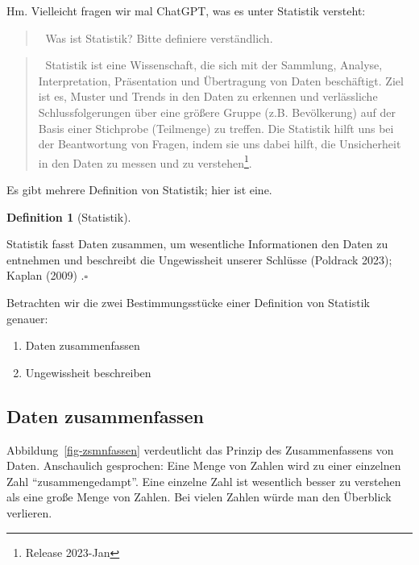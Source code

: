 \documentclass[
  a4paper,
  DIV=11]{scrreprt}
\providecommand{\tightlist}{%
  \setlength{\itemsep}{0pt}\setlength{\parskip}{0pt}}\usepackage{longtable,booktabs,array}
\theoremstyle{definition}
\theoremstyle{definition}
\theoremstyle{definition}
\newtheorem{definition}{Definition}[chapter]
\theoremstyle{remark}
\begin{document}
Hm. Vielleicht fragen wir mal ChatGPT, was es unter Statistik versteht:

\begin{quote}
👨 Was ist Statistik? Bitte definiere verständlich.
\end{quote}

\begin{quote}
🤖 Statistik ist eine Wissenschaft, die sich mit der Sammlung, Analyse,
Interpretation, Präsentation und Übertragung von Daten beschäftigt. Ziel
ist es, Muster und Trends in den Daten zu erkennen und verlässliche
Schlussfolgerungen über eine größere Gruppe (z.B. Bevölkerung) auf der
Basis einer Stichprobe (Teilmenge) zu treffen. Die Statistik hilft uns
bei der Beantwortung von Fragen, indem sie uns dabei hilft, die
Unsicherheit in den Daten zu messen und zu verstehen\footnote{Release
  2023-Jan}.
\end{quote}

Es gibt mehrere Definition von Statistik; hier ist eine.

\begin{definition}[Statistik]\protect\hypertarget{def-statistik}{}\label{def-statistik}

Statistik fasst Daten zusammen, um wesentliche Informationen den Daten
zu entnehmen und beschreibt die Ungewissheit unserer Schlüsse (Poldrack
2023); Kaplan (2009) .\(\square\)

\end{definition}

Betrachten wir die zwei Bestimmungsstücke einer Definition von Statistik
genauer:

\begin{enumerate}
\def\labelenumi{\arabic{enumi}.}
\tightlist
\item
  Daten zusammenfassen
\item
  Ungewissheit beschreiben
\end{enumerate}

\subsection{Daten zusammenfassen}\label{daten-zusammenfassen}

Abbildung~\ref{fig-zsmnfassen} verdeutlicht das Prinzip des
Zusammenfassens von Daten. Anschaulich gesprochen: Eine Menge von Zahlen
wird zu einer einzelnen Zahl ``zusammengedampt''. Eine einzelne Zahl ist
wesentlich besser zu verstehen als eine große Menge von Zahlen. Bei
vielen Zahlen würde man den Überblick verlieren.
\end{document}
